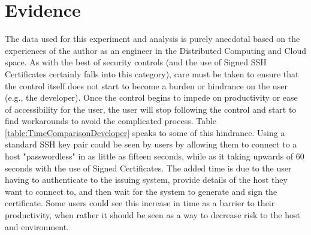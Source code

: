 \documentclass[conference]{IEEEtran}
\begin{document}
\begin{table}[ht]
\caption{Comparison of Time Spent Maintaining Signed SSH Certificates as compared to Public/Private Key pairs}
\end{table}

\section{Evidence}

The data used for this experiment and analysis is purely anecdotal based on the experiences of the author as an engineer in the Distributed Computing and Cloud space. As with the best of security controls (and the use of Signed SSH Certificates certainly falls into this category), care must be taken to ensure that the control itself does not start to become a burden or hindrance on the user (e.g., the developer). Once the control begins to impede on productivity or ease of accessibility for the user, the user will stop following the control and start to find workarounds to avoid the complicated process. Table \ref{table:TimeComparisonDeveloper} speaks to some of this hindrance. Using a standard SSH key pair could be seen by users by allowing them to connect to a host "passwordless" in as little as fifteen seconds, while as it taking upwards of 60 seconds with the use of Signed Certificates. The added time is due to the user having to authenticate to the issuing system, provide details of the host they want to connect to, and then wait for the system to generate and sign the certificate. Some users could see this increase in time as a barrier to their productivity, when rather it should be seen as a way to decrease risk to the host and environment.
\end{document}
